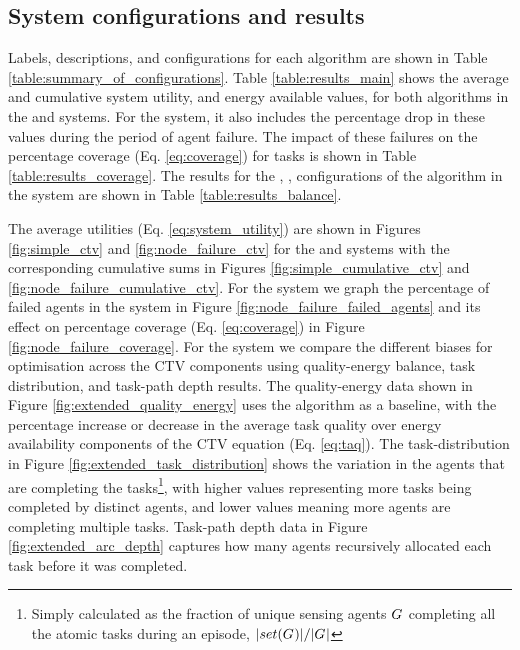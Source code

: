 \subsection{System configurations and results}
Labels, descriptions, and configurations for each algorithm are shown in Table \ref{table:summary_of_configurations}. Table \ref{table:results_main} shows the average and cumulative system utility, and energy available values, for both algorithms in the \simulationSimple{}{} and  \simulationNodeFailure{}{} systems. For the \simulationNodeFailure{}{} system, it also includes the percentage drop in these values during the period of agent failure. The impact of these failures on the percentage coverage (Eq. \ref{eq:coverage}) for tasks is shown in Table \ref{table:results_coverage}. The results for the \algorithmEnergy{}{}, \algorithmQuality{}{}, \algorithmDistribution{}{} configurations of the \acronymWSNOptimisation{}{} algorithm in the \simulationExtended{}{} system are shown in Table \ref{table:results_balance}. 

The average utilities  (Eq. \ref{eq:system_utility}) are shown in Figures \ref{fig:simple_ctv} and \ref{fig:node_failure_ctv} for the \simulationSimple{}{} and \simulationNodeFailure{}{} systems with the corresponding cumulative sums in Figures \ref{fig:simple_cumulative_ctv} and \ref{fig:node_failure_cumulative_ctv}. For the \simulationNodeFailure{}{} system we graph the percentage of failed agents in the system in Figure \ref{fig:node_failure_failed_agents} and its effect on percentage coverage (Eq. \ref{eq:coverage}) in Figure \ref{fig:node_failure_coverage}.  For the \simulationExtended{}{} system we compare the different biases for optimisation across the CTV components using quality-energy balance, task distribution, and task-path depth results. The quality-energy data shown in Figure \ref{fig:extended_quality_energy} uses the \algorithmEnergy{}{} algorithm as a baseline, with the percentage increase or decrease in the average task quality over energy availability components of the CTV equation (Eq. \ref{eq:taq}). The task-distribution in Figure \ref{fig:extended_task_distribution} shows the variation in the agents that are completing the tasks\footnote{ Simply calculated as the fraction of unique sensing agents $G_{}^{}$ completing all the atomic tasks during an episode, $\lvert set(G_{}^{}) \rvert{}/\lvert G_{}^{} \rvert{}$}, with higher values representing more tasks being completed by distinct agents, and lower values meaning more agents are completing multiple tasks. Task-path depth data in Figure \ref{fig:extended_arc_depth} captures how many agents recursively allocated each task before it was completed.